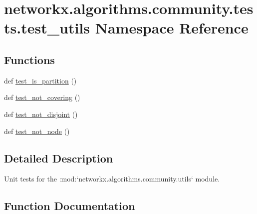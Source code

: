 \hypertarget{namespacenetworkx_1_1algorithms_1_1community_1_1tests_1_1test__utils}{}\section{networkx.\+algorithms.\+community.\+tests.\+test\+\_\+utils Namespace Reference}
\label{namespacenetworkx_1_1algorithms_1_1community_1_1tests_1_1test__utils}
\subsection*{Functions}
\begin{DoxyCompactItemize}
\item 
def \hyperlink{namespacenetworkx_1_1algorithms_1_1community_1_1tests_1_1test__utils_a9a4da74ed3a34731fd631a5467883c69}{test\+\_\+is\+\_\+partition} ()
\item 
def \hyperlink{namespacenetworkx_1_1algorithms_1_1community_1_1tests_1_1test__utils_a6f7e1c9165bb2949ab4b31aae986fc7d}{test\+\_\+not\+\_\+covering} ()
\item 
def \hyperlink{namespacenetworkx_1_1algorithms_1_1community_1_1tests_1_1test__utils_a518340c03d6883e900b3c6b7489a06ad}{test\+\_\+not\+\_\+disjoint} ()
\item 
def \hyperlink{namespacenetworkx_1_1algorithms_1_1community_1_1tests_1_1test__utils_a243211de11a9ded3bdc03e21e1873da2}{test\+\_\+not\+\_\+node} ()
\end{DoxyCompactItemize}


\subsection{Detailed Description}
\begin{DoxyVerb}Unit tests for the :mod:`networkx.algorithms.community.utils` module.\end{DoxyVerb}
 

\subsection{Function Documentation}
\mbox{\label{namespacenetworkx_1_1algorithms_1_1community_1_1tests_1_1test__utils_a9a4da74ed3a34731fd631a5467883c69}} 
